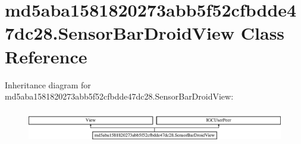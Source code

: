 \hypertarget{classmd5aba1581820273abb5f52cfbdde47dc28_1_1SensorBarDroidView}{}\section{md5aba1581820273abb5f52cfbdde47dc28.\+Sensor\+Bar\+Droid\+View Class Reference}
\label{classmd5aba1581820273abb5f52cfbdde47dc28_1_1SensorBarDroidView}
Inheritance diagram for md5aba1581820273abb5f52cfbdde47dc28.\+Sensor\+Bar\+Droid\+View\+:\begin{figure}[H]
\begin{center}
\leavevmode
\includegraphics[height=1.458333cm]{classmd5aba1581820273abb5f52cfbdde47dc28_1_1SensorBarDroidView}
\end{center}
\end{figure}
